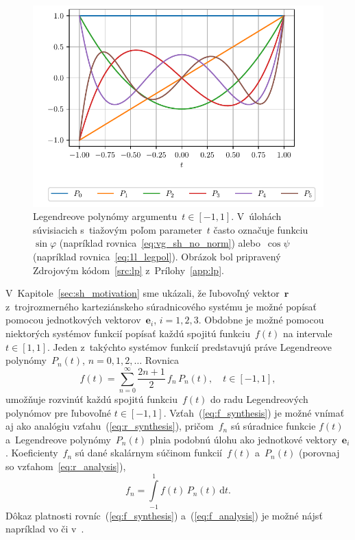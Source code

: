\documentclass[a4paper, 12pt]{book}
\newcommand{\diff}{\mathrm d}
\let\vec\mathbf
\begin{document}
\begin{figure}[bt]
\centering
\includegraphics{./fig-legendre-polynomials.pdf}
\caption{Legendreove polynómy argumentu~$t \in [-1, 1]$.  V~úlohách súvisiacich 
s~tiažovým poľom parameter~$t$ často označuje funkciu~$\sin\varphi$ (napríklad 
rovnica~\ref{eq:vg_sh_no_norm}) alebo~$\cos\psi$ (napríklad 
rovnica~\ref{eq:1l_legpol}).  Obrázok bol pripravený Zdrojovým
kódom~\ref{src:lp} z~Prílohy~\ref{app:lp}.}
\label{fig:lp}
\end{figure}

V~Kapitole~\ref{sec:sh_motivation} sme ukázali, že ľubovoľný vektor~$\vec r$
z~trojrozmerného karteziánskeho súradnicového systému je možné popísať pomocou
jednotkových vektorov~$\vec e_i$, $i = 1, 2, 3$.  Obdobne je možné pomocou
niektorých systémov funkcií popísať každú spojitú funkciu~$f(t)$ na intervale
$t \in [1, 1]$.  Jeden z~takýchto systémov funkcií predstavujú práve
Legendreove polynómy~$P_n(t)$, $n = 0, 1, 2, \dots$  Rovnica
%
\begin{equation}
\label{eq:f_synthesis}
f(t) = \sum_{n = 0}^\infty \frac{2n + 1}{2} \, f_n \, P_n(t){,} \quad t \in 
[-1, 1]{,}
\end{equation}
%
umožňuje rozvinúť každú spojitú funkciu~$f(t)$ do radu Legendreových polynómov
pre ľubovoľné $t \in [-1, 1]$.  Vzťah~(\ref{eq:f_synthesis}) je možné vnímať aj
ako analógiu vzťahu~(\ref{eq:r_synthesis}), pričom~$f_n$ sú súradnice funkcie
$f(t)$ a~Legendreove polynómy~$P_n(t)$ plnia podobnú úlohu ako jednotkové
vektory~$\vec e_i$.  Koeficienty~$f_n$ sú dané skalárnym súčinom funkcií~$f(t)$
a~$P_n(t)$ (porovnaj so vzťahom~\ref{eq:r_analysis}),
%
\begin{equation}
\label{eq:f_analysis}
f_n = \int\limits_{-1}^1 f(t) \, P_n(t) \, \diff t{.}
\end{equation}
%
Dôkaz platnosti rovníc~(\ref{eq:f_synthesis}) a~(\ref{eq:f_analysis}) je možné 
nájsť napríklad vo \textcite{Freeden2009} či 
v~\textcite{SansoGeoidDetermination}.
\end{document}
